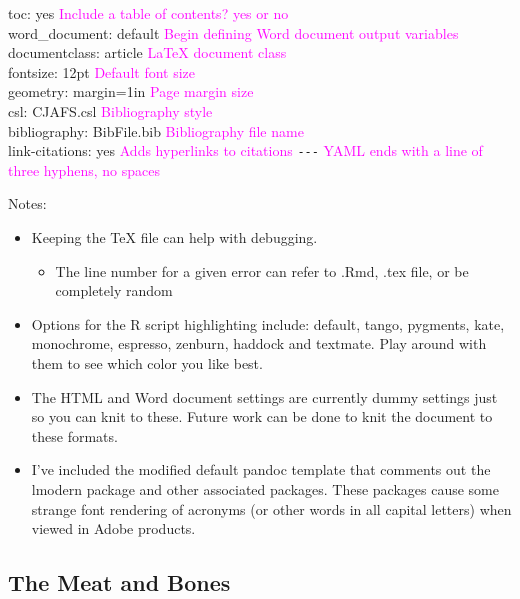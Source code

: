 \documentclass[12pt,]{article}
\providecommand{\tightlist}{%
  \setlength{\itemsep}{0pt}\setlength{\parskip}{0pt}}
\begin{document}
toc: yes \textcolor{magenta}{Include a table of contents? yes or no}\\
\hspace*{0.333em}\hspace*{0.333em} word\_document: default
\textcolor{magenta}{Begin defining Word document output variables}\\
documentclass: article \textcolor{magenta}{LaTeX document class}\\
fontsize: 12pt \textcolor{magenta}{Default font size}\\
geometry: margin=1in \textcolor{magenta}{Page margin size}\\
csl: CJAFS.csl \textcolor{magenta}{Bibliography style}\\
bibliography: BibFile.bib \textcolor{magenta}{Bibliography file name}\\
link-citations: yes \textcolor{magenta}{Adds hyperlinks to citations}
\texttt{-\/-\/-}
\textcolor{magenta}{YAML ends with a line of three hyphens, no spaces}

Notes:

\begin{itemize}
\item
  Keeping the TeX file can help with debugging.

  \begin{itemize}
  \tightlist
  \item
    The line number for a given error can refer to .Rmd, .tex file, or
    be completely random
  \end{itemize}
\item
  Options for the R script highlighting include: default, tango,
  pygments, kate, monochrome, espresso, zenburn, haddock and textmate.
  Play around with them to see which color you like best.
\item
  The HTML and Word document settings are currently dummy settings just
  so you can knit to these. Future work can be done to knit the document
  to these formats.
\item
  I've included the modified default pandoc template that comments out
  the lmodern package and other associated packages. These packages
  cause some strange font rendering of acronyms (or other words in all
  capital letters) when viewed in Adobe products.
\end{itemize}

\subsection{The Meat and Bones}\label{the-meat-and-bones}
\end{document}
